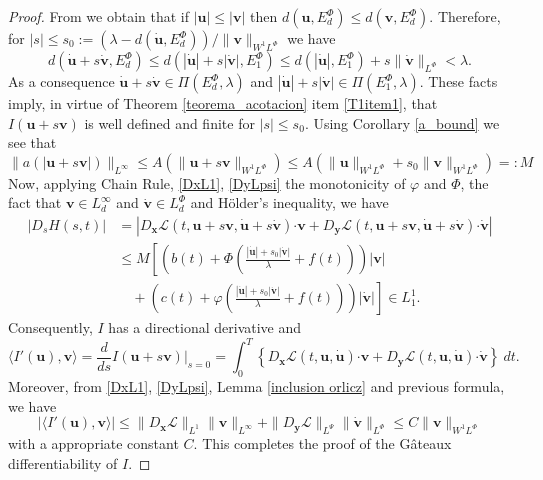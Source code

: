 \documentclass[twoside]{article}
\theoremstyle{remark}
\newcommand{\orlnor}{\|_{L^{\Phi}}}
\newcommand{\linf}{\|_{L^{\infty}}}
\newcommand{\lphi}{L^{\Phi}}
\newcommand{\lpsi}{L^{\Psi}}
\newcommand{\ephi}{E^{\Phi}}
\newcommand{\sobnor}{\|_{W^{1}\lphi}}
\renewcommand{\b}[1]{\boldsymbol{#1}}
\newcommand{\ccdot}{\b{\cdot}}
\renewcommand{\leq}{\leqslant}
\begin{document}
\begin{proof}
From \cite[Thm. 10.1]{KR} we obtain that if $|\b{u}|\leq |\b{v}|$ then    $d(\b{u},\ephi_d)\leq d(\b{v},\ephi_d)$. 
Therefore, for  $|s|\leq s_0:=\left(\lambda-d(\b{\dot{u}},\ephi_d)\right)/\|\b{v}\sobnor$ we have
\[
d \left(\b{\dot{u}}+s\b{\dot{v}}, \ephi_d \right)\leq
d \left(|\b{\dot{u}}|+s|\b{\dot{v}}|, \ephi_1 \right)
\leq d \left(|\b{\dot{u}}|,\ephi_1 \right)+ s \|\b{\dot{v}}\orlnor < \lambda.
\]
As a consequence $\b{\dot{u}}+s\b{\dot{v}} \in \Pi(\ephi_d,\lambda)$ and  $|\b{\dot{u}}|+s|\b{\dot{v}}| \in \Pi(\ephi_1,\lambda)$. These facts imply, in virtue of Theorem \ref{teorema_acotacion} item \ref{T1item1}, that $I(\b{u}+s\b{v})$ is well defined and finite for $|s|\leq s_0$. 
Using  Corollary \ref{a_bound} we see that
\[ \|a(|\b{u}+s\b{v}|)\|_{L^{\infty}}\leq  A(\|\b{u}+s\b{v}\sobnor)\leq
 A(\|\b{u}\sobnor+s_0\|\b{v}\sobnor)=:M
\]
Now, applying Chain Rule, \eqref{DxL1}, \eqref{DyLpsi} the monotonicity of $\varphi$ and $\Phi$, 
the fact that $\b{v}\in L^{\infty}_d$ and $\b{\dot{v}}\in\lphi_d$ and H\"older's inequality, we have
\begin{equation}\label{ctg}
\begin{split}
|D_s H(s,t)|&=\left| D_{\b{x}}\mathcal{L}(t,\b{u}+s\b{v},\b{\dot{u}}+s\b{\dot{v}})\ccdot \b{v} +  D_{\b{y}}\mathcal{L}(t,\b{u}+s\b{v},\b{\dot{u}}+s\b{\dot{v}})\ccdot\b{\dot{v}}\right| \\
 & \leq M \left[\left( b(t)+ \Phi\left(\frac{|\b{\dot{u}}|+s_0|\b{\dot{v}}|}{\lambda}+f(t)\right)\right)|\b{v}|\right.\\
&\left. \quad+ \left(c(t)+ \varphi\left (\frac{|\b{\dot{u}}|+s_0|\b{\dot{v}}|}{\lambda}+f(t)\right)\right)|\b{\dot{v}}| \right]\in L^1_1.
\end{split}
\end{equation}
Consequently, $I$ has a directional derivative and
\[
\langle I'(\b{u}),\b{v} \rangle=\frac{d}{ds}I(\b{u}+s\b{v})\big|_{s=0}=\int_0^T  
\left\{D_{\b{x}}\mathcal{L}(t,\b{u},\b{\dot{u}})\ccdot \b{v}+ D_{\b{y}}\mathcal{L}(t,\b{u},\b{\dot{u}})\ccdot\b{\dot{v}}\right\} \ dt.
\]
Moreover, from \eqref{DxL1}, \eqref{DyLpsi}, Lemma \ref{inclusion orlicz} and previous formula, we have
\[
|\langle I'(\b{u}),\b{v} \rangle| \leq \|D_{\b{x}}\mathcal{L}\|_{L^1} \| \b{v}\linf + 
\|D_{\b{y}}\mathcal{L}\|_{\lpsi} \|\b{\dot{v}}\orlnor \leq C \|\b{v}\sobnor
\]
with a appropriate constant $C$.
This completes the proof of the G\^ateaux differentiability of $I$. 


\end{proof}
\end{document}
